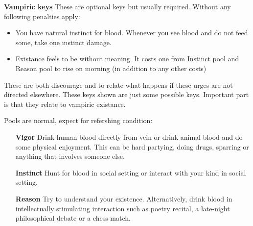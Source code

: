 \documentclass[a4paper, 12pt, finnish]{report}
\begin{document}
\pagebreak
\textbf{Vampiric keys}
These are optional keys but usually required. Without any following penalties apply:
\begin{itemize}
\setlength\itemsep{-2pt}
\item You have natural instinct for blood. Whenever you see blood and do not feed some, take one instinct damage.
\item Existance feels to be without meaning. It costs one from Instinct pool and Reason pool to rise on morning (in addition to any other costs)
\end{itemize}
These are both discourage and to relate what happens if these urges are not directed elsewhere.
These keys shown are just some possible keys.
Important part is that they relate to vampiric existance.

\cols{
\VampiricKey{}
}

\pagebreak
Pools are normal, expect for refershing condition:

\begin{itemize}
\item[\textbf{Vigor}] Drink human blood directly from vein or drink animal blood and do some physical enjoyment. This can be hard partying, doing drugs, sparring or anything that involves someone else.
\item[\textbf{Instinct}] Hunt for blood in social setting or interact with your kind in social setting.
\item[\textbf{Reason}] Try to understand your existence. Alternatively, drink blood in intellectually stimulating interaction such as poetry recital, a late-night philosophical debate or a chess match.
\end{itemize}
\end{document}
